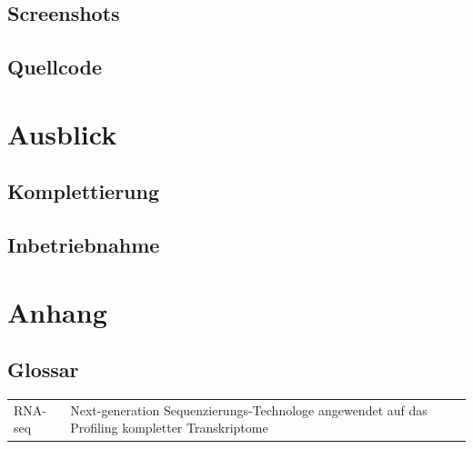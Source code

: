 \documentclass[a4paper]{thesis}
\begin{document}
\subsection{Screenshots}

\subsection{Quellcode}


\paragraphmark{}

\section{Ausblick}

\subsection{Komplettierung}

\subsection{Inbetriebnahme}

\section{Anhang}

\subsection{Glossar}

\begin{tabularx}{\textwidth}{lX}
	  RNA-seq
	& Next-generation Sequenzierungs-Technologe angewendet auf
          das Profiling kompletter Transkriptome
\\
\end{tabularx}

\end{document}
